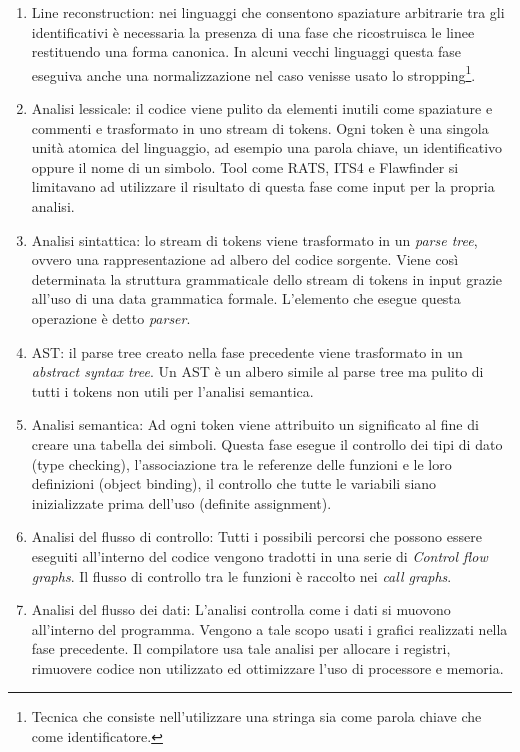 \begin{enumerate}
\item Line reconstruction: nei linguaggi che consentono spaziature arbitrarie tra gli identificativi è necessaria la presenza di una fase che ricostruisca le linee restituendo una forma canonica. In alcuni vecchi linguaggi questa fase eseguiva anche una normalizzazione nel caso venisse usato lo stropping\footnote{Tecnica che consiste nell'utilizzare una stringa sia come parola chiave che come identificatore.}.
\item Analisi lessicale: il codice viene pulito da elementi inutili come spaziature e commenti e trasformato in uno stream di tokens. Ogni token è una singola unità atomica del linguaggio, ad esempio una parola chiave, un identificativo oppure il nome di un simbolo. Tool come RATS, ITS4 e Flawfinder si limitavano ad utilizzare il risultato di questa fase come input per la propria analisi.
\item Analisi sintattica: lo stream di tokens viene trasformato in un \emph{parse tree}, ovvero una rappresentazione ad albero del codice sorgente. Viene così determinata la struttura grammaticale dello stream di tokens in input grazie all'uso di una data grammatica formale. L'elemento che esegue questa operazione è detto \emph{parser}.
\item AST: il parse tree creato nella fase precedente viene trasformato in un \emph{abstract syntax tree}. Un AST è un albero simile al parse tree ma pulito di tutti i tokens non utili per l'analisi semantica.
\item Analisi semantica: Ad ogni token viene attribuito un significato al fine di creare una tabella dei simboli. Questa fase esegue il controllo dei tipi di dato (type checking), l'associazione tra le referenze delle funzioni e le loro definizioni (object binding), il controllo che tutte le variabili siano inizializzate prima dell'uso (definite assignment).
\item Analisi del flusso di controllo: Tutti i possibili percorsi che possono essere eseguiti all'interno del codice vengono tradotti in una serie di \emph{Control flow graphs}. Il flusso di controllo tra le funzioni è raccolto nei \emph{call graphs}.
\item Analisi del flusso dei dati: L'analisi controlla come i dati si muovono all'interno del programma. Vengono a tale scopo usati i grafici realizzati nella fase precedente. Il compilatore usa tale analisi per allocare i registri, rimuovere codice non utilizzato ed ottimizzare l'uso di processore e memoria.
\end{enumerate}

